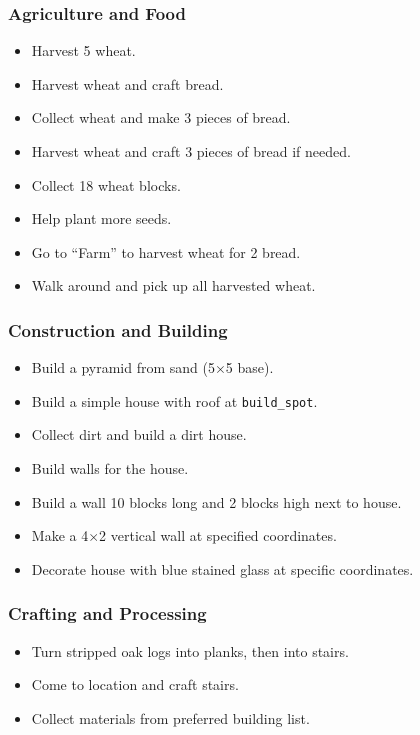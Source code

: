 \appxsmallsep
\subsubsection{Agriculture and Food}
\begin{itemize}
  \item Harvest 5 wheat.
  \item Harvest wheat and craft bread.
  \item Collect wheat and make 3 pieces of bread.
  \item Harvest wheat and craft 3 pieces of bread if needed.
  \item Collect 18 wheat blocks.
  \item Help plant more seeds.
  \item Go to ``Farm'' to harvest wheat for 2 bread.
  \item Walk around and pick up all harvested wheat.
\end{itemize}

\appxsmallsep
\subsubsection{Construction and Building}
\begin{itemize}
  \item Build a pyramid from sand (5$\times$5 base).
  \item Build a simple house with roof at \texttt{build\_spot}.
  \item Collect dirt and build a dirt house.
  \item Build walls for the house.
  \item Build a wall 10 blocks long and 2 blocks high next to house.
  \item Make a 4$\times$2 vertical wall at specified coordinates.
  \item Decorate house with blue stained glass at specific coordinates.
\end{itemize}

\appxsmallsep
\subsubsection{Crafting and Processing}
\begin{itemize}
  \item Turn stripped oak logs into planks, then into stairs.
  \item Come to location and craft stairs.
  \item Collect materials from preferred building list.
\end{itemize}

